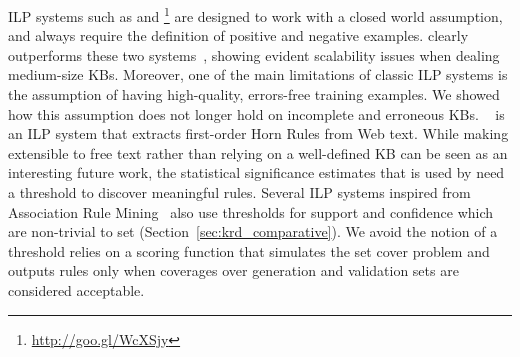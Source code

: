 
ILP systems such as  and \footnote{\url{http://goo.gl/WcXSjy}} are designed to work with a closed world assumption, 
and always require the definition of positive and negative examples. \amie clearly outperforms these two systems~\cite{galarraga2015fast}, showing evident scalability issues 
when dealing medium-size KBs. Moreover, one of the main limitations of classic ILP systems is the assumption of having high-quality, errors-free training examples. 
We showed how this assumption does not longer hold on incomplete and erroneous KBs. ~\cite{schoenmackers2010learning} is an ILP system that extracts first-order Horn Rules 
from Web text. While making \krd extensible to free text rather than relying on a well-defined KB can be seen as an interesting future work, 
the statistical significance estimates that is used by 
 need a threshold to discover meaningful rules. Several ILP systems inspired from Association Rule Mining~\cite{agrawal1993mining} also use thresholds for 
support and confidence which are non-trivial to set (Section~\ref{sec:krd_comparative}). We avoid the notion of a threshold \krd relies on a scoring function that simulates the set cover problem and outputs rules only when coverages over generation and validation sets are considered acceptable.


